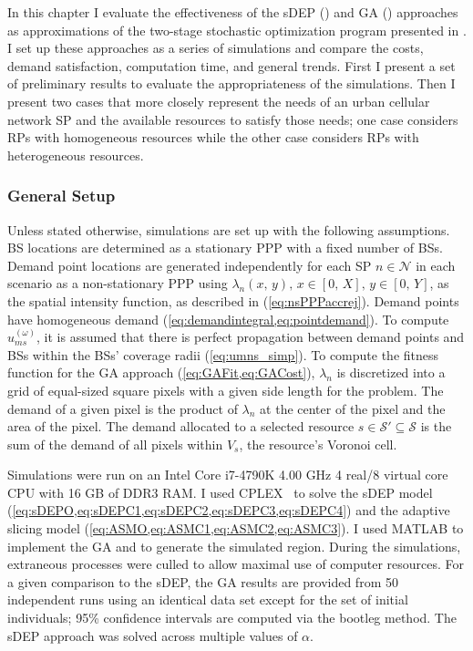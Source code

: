 \documentclass[12pt,dvipsnames]{report}
\begin{document}
In this chapter I evaluate the effectiveness of the sDEP () and GA () approaches as approximations of the two-stage stochastic optimization program presented in .  I set up these approaches as a series of simulations and compare the costs, demand satisfaction, computation time, and general trends.  First I present a set of preliminary results to evaluate the appropriateness of the simulations.  Then I present two cases that more closely represent the needs of an urban cellular network SP and the available resources to satisfy those needs; one case considers RPs with homogeneous resources while the other case considers RPs with heterogeneous resources.

\subsubsection{General Setup}

Unless stated otherwise, simulations are set up with the following assumptions.  BS locations are determined as a stationary PPP with a fixed number of BSs.  Demand point locations are generated independently for each SP $n \in \mathcal{N}$ in each scenario as a non-stationary PPP using $\lambda_n\left( x,\, y \right),\, x \in \left[ 0,\, X \right],\, y \in \left[ 0,\, Y \right]$, as the spatial intensity function, as described in  (\cref{eq:nsPPPaccrej}).  Demand points have homogeneous demand (\cref{eq:demandintegral,eq:pointdemand}).  To compute $u_{ms}^{\left( \omega \right)}$, it is assumed that there is perfect propagation between demand points and BSs within the BSs' coverage radii (\cref{eq:umns_simp}).  To compute the fitness function for the GA approach (\cref{eq:GAFit,eq:GACost}), $\lambda_n$ is discretized into a grid of equal-sized square pixels with a given side length for the problem.  The demand of a given pixel is the product of $\lambda_n$ at the center of the pixel and the area of the pixel.  The demand allocated to a selected resource $s \in \mathcal{S}' \subseteq \mathcal{S}$ is the sum of the demand of all pixels within $V_s$, the resource's Voronoi cell.

Simulations were run on an Intel Core i7-4790K 4.00 GHz 4 real/8 virtual core CPU with 16 GB of DDR3 RAM.  I used CPLEX~\cite{Cplex} to solve the sDEP model (\cref{eq:sDEPO,eq:sDEPC1,eq:sDEPC2,eq:sDEPC3,eq:sDEPC4}) and the adaptive slicing model (\cref{eq:ASMO,eq:ASMC1,eq:ASMC2,eq:ASMC3}).  I used MATLAB to implement the GA and to generate the simulated region.  During the simulations, extraneous processes were culled to allow maximal use of computer resources.  For a given comparison to the sDEP, the GA results are provided from 50 independent runs using an identical data set except for the set of initial individuals; 95\% confidence intervals are computed via the bootleg method.  The sDEP approach was solved across multiple values of $\alpha$.
\end{document}
